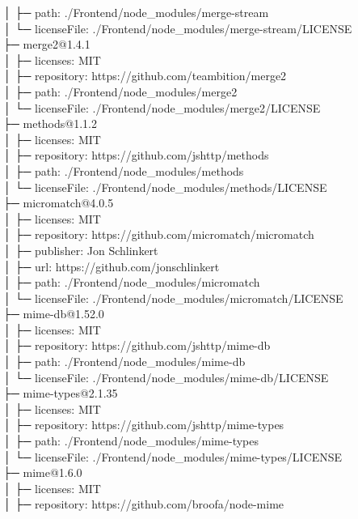 │  ├─ path: ./Frontend/node\_modules/merge-stream\\
│  └─ licenseFile: ./Frontend/node\_modules/merge-stream/LICENSE\\
├─ merge2@1.4.1\\
│  ├─ licenses: MIT\\
│  ├─ repository: https://github.com/teambition/merge2\\
│  ├─ path: ./Frontend/node\_modules/merge2\\
│  └─ licenseFile: ./Frontend/node\_modules/merge2/LICENSE\\
├─ methods@1.1.2\\
│  ├─ licenses: MIT\\
│  ├─ repository: https://github.com/jshttp/methods\\
│  ├─ path: ./Frontend/node\_modules/methods\\
│  └─ licenseFile: ./Frontend/node\_modules/methods/LICENSE\\
├─ micromatch@4.0.5\\
│  ├─ licenses: MIT\\
│  ├─ repository: https://github.com/micromatch/micromatch\\
│  ├─ publisher: Jon Schlinkert\\
│  ├─ url: https://github.com/jonschlinkert\\
│  ├─ path: ./Frontend/node\_modules/micromatch\\
│  └─ licenseFile: ./Frontend/node\_modules/micromatch/LICENSE\\
├─ mime-db@1.52.0\\
│  ├─ licenses: MIT\\
│  ├─ repository: https://github.com/jshttp/mime-db\\
│  ├─ path: ./Frontend/node\_modules/mime-db\\
│  └─ licenseFile: ./Frontend/node\_modules/mime-db/LICENSE\\
├─ mime-types@2.1.35\\
│  ├─ licenses: MIT\\
│  ├─ repository: https://github.com/jshttp/mime-types\\
│  ├─ path: ./Frontend/node\_modules/mime-types\\
│  └─ licenseFile: ./Frontend/node\_modules/mime-types/LICENSE\\
├─ mime@1.6.0\\
│  ├─ licenses: MIT\\
│  ├─ repository: https://github.com/broofa/node-mime\\

